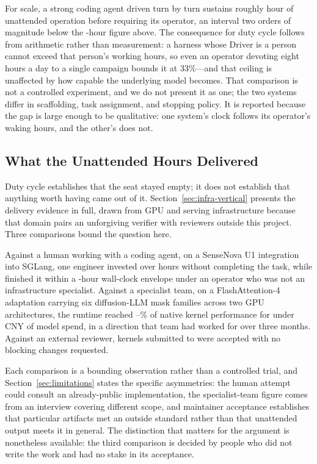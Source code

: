 For scale, a strong coding agent driven turn by turn sustains roughly
\CodexEndurance{} hour of unattended operation before requiring its operator, an
interval two orders of magnitude below the \DutyInterval{}-hour figure above. The
consequence for duty cycle follows from arithmetic rather than measurement: a harness
whose Driver is a person cannot exceed that person's working hours, so even an
operator devoting eight hours a day to a single campaign bounds it at
33\%---and that ceiling is unaffected by how capable the underlying model becomes. That
comparison is not a controlled experiment, and we do not present it as one; the two
systems differ in scaffolding, task assignment, and stopping policy. It is reported
because the gap is large enough to be qualitative: one system's clock follows its
operator's waking hours, and the other's does not.

\subsection{What the Unattended Hours Delivered}
\label{sec:delivery}

Duty cycle establishes that the seat stayed empty; it does not establish that
anything worth having came out of it. Section~\ref{sec:infra-vertical} presents the
delivery evidence in full, drawn from GPU and serving infrastructure because that
domain pairs an unforgiving verifier with reviewers outside this project. Three
comparisons bound the question here.

Against a human working with a coding agent, on a SenseNova U1 integration into
SGLang, one engineer invested over \SGLangHumanHours{} hours without completing the
task, while \systemname{} finished it within a \SGLangArgusHours{}-hour wall-clock
envelope under an operator who was not an infrastructure specialist. Against a
specialist team, on a FlashAttention-4 adaptation carrying six diffusion-LLM mask
families across two GPU architectures, the runtime reached
\FlashDAGapLow--\FlashDAGapHigh\% of native kernel performance for under
\FlashDACostCNY{} CNY of model spend, in a direction that team had worked for over
three months. Against an external reviewer, \FLAPRTotal{} kernels submitted to
 were accepted with no blocking changes requested.

Each comparison is a bounding observation rather than a controlled trial, and
Section~\ref{sec:limitations} states the specific asymmetries: the human attempt
could consult an already-public implementation, the specialist-team figure comes from
an interview covering different scope, and maintainer acceptance establishes that
particular artifacts met an outside standard rather than that unattended output meets
it in general. The distinction that matters for the argument is nonetheless
available: the third comparison is decided by people who did not write the work and
had no stake in its acceptance.

